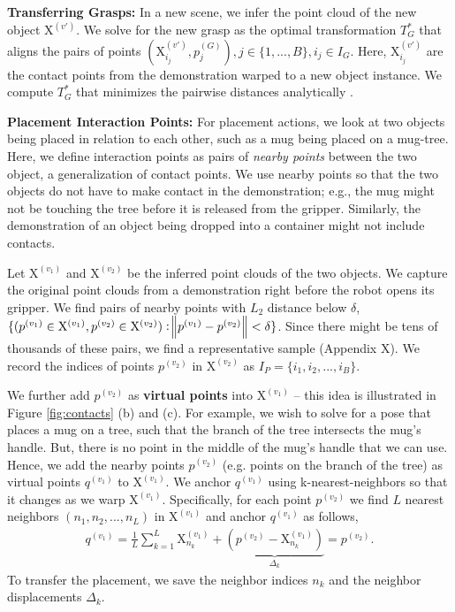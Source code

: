 \documentclass{article}
\newcommand{\pcx}[1]{\mathrm{X}^{(#1)}}
\begin{document}
\textbf{Transferring Grasps:} In a new scene, we infer the point cloud of the new object $\pcx{v'}$. We solve for the new grasp as the optimal transformation $T_G^*$ that aligns the pairs of points $(\pcx{v'}_{i_j}, p^{(G)}_j), j \in \{1, ..., B\}, i_j \in I_G$. Here, $\pcx{v'}_{i_j}$ are the contact points from the demonstration warped to a new object instance. We compute $T_G^*$ that minimizes the pairwise distances analytically \cite{horn88computation}.

\textbf{Placement Interaction Points:} For placement actions, we look at two objects being placed in relation to each other, such as a mug being placed on a mug-tree. Here, we define interaction points as pairs of \textit{nearby points} between the two object, a generalization of contact points. We use nearby points so that the two objects do not have to make contact in the demonstration; e.g., the mug might not be touching the tree before it is released from the gripper. Similarly, the demonstration of an object being dropped into a container might not include contacts.

Let $\pcx{v_1}$ and $\pcx{v_2}$ be the inferred point clouds of the two objects. We capture the original point clouds from a demonstration right before the robot opens its gripper. We find pairs of nearby points with $L_2$ distance below $\delta$, $\{ (p^{(v_1)} \in \pcx{v_1}, p^{(v_2)} \in \pcx{v_2}) : \norm{p^{(v_1)} - p^{(v_2)}} < \delta \}$. Since there might be tens of thousands of these pairs, we find a representative sample (Appendix X). We record the indices of points $p^{(v_2)}$ in $\pcx{v_2}$ as $I_P = \{ i_1, i_2, ..., i_B \}$.

We further add $p^{(v_2)}$ as \textbf{virtual points} into $\pcx{v_1}$ -- this idea is illustrated in Figure \ref{fig:contacts} (b) and (c). For example, we wish to solve for a pose that places a mug on a tree, such that the branch of the tree intersects the mug's handle. But, there is no point in the middle of the mug's handle that we can use. Hence, we add the nearby points $p^{(v_2)}$ (e.g. points on the branch of the tree) as virtual points $q^{(v_1)}$ to $\pcx{v_1}$. We anchor $q^{(v_1)}$ using k-nearest-neighbors so that it changes as we warp $\pcx{v_1}$. Specifically, for each point $p^{(v_2)}$ we find $L$ nearest neighbors $(n_1, n_2, ..., n_L)$ in $\pcx{v_1}$ and anchor $q^{(v_1)}$ as follows,
\begin{align}
    q^{(v_1)} = \frac{1}{L} \sum_{k=1}^L \pcx{v_1}_{n_k} + \underbrace{(p^{(v_2)} - \pcx{v_1}_{n_k})}_{\Delta_k} = p^{(v_2)}.
\end{align}
To transfer the placement, we save the neighbor indices $n_k$ and the neighbor displacements $\Delta_k$.
\end{document}
